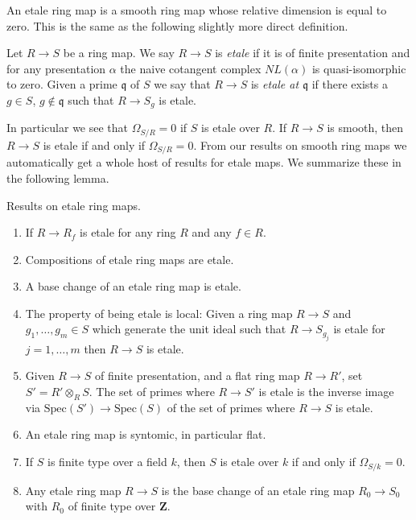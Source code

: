 \noindent
An etale ring map is a smooth ring map whose relative dimension
is equal to zero. This is the same as the following slightly more
direct definition.

\begin{definition}
\label{definition-etale}
Let $R \to S$ be a ring map.
We say $R \to S$ is {\it etale} if it is of finite presentation
and for any presentation $\alpha$ the naive cotangent complex
$NL(\alpha)$ is quasi-isomorphic to zero. Given a prime $\mathfrak q$
of $S$ we say that $R \to S$ is {\it etale at $\mathfrak q$}
if there exists a $g \in S$, $g \not \in \mathfrak q$ such that
$R \to S_g$ is etale.
\end{definition}

\noindent
In particular we see that $\Omega_{S/R} = 0$ if $S$ is etale over $R$.
If $R \to S$ is smooth,
then $R \to S$ is etale if and only if $\Omega_{S/R} = 0$.
From our results on smooth ring maps we automatically get a whole host
of results for etale maps. We summarize these in the following
lemma.

\begin{lemma}
\label{lemma-etale}
Results on etale ring maps.
\begin{enumerate}
\item If $R \to R_f$ is etale for any ring $R$ and any $f \in R$.
\item Compositions of etale ring maps are etale.
\item A base change of an etale ring map is etale.
\item The property of being etale is local: Given a ring map
$R \to S$ and $g_1, \ldots, g_m \in S$ which generate the unit ideal
such that $R \to S_{g_j}$ is etale for $j = 1, \ldots, m$ then
$R \to S$ is etale.
\item Given $R \to S$ of finite presentation, and a flat ring map
$R \to R'$, set $S' = R' \otimes_R S$. The set of primes where $R \to S'$
is etale is the inverse image via $\text{Spec}(S') \to \text{Spec}(S)$
of the set of primes where $R \to S$ is etale.
\item An etale ring map is syntomic, in particular flat.
\item If $S$ is finite type over a field $k$, then $S$ is etale over
$k$ if and only if $\Omega_{S/k} = 0$.
\item Any etale ring map $R \to S$ is the base change of an etale
ring map $R_0 \to S_0$ with $R_0$ of finite type over $\mathbf{Z}$.
\end{enumerate}
\end{lemma}

